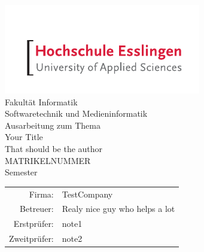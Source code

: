 \begin{titlepage}
	\begin{center}
		\includegraphics[scale=2.5]{bilder/hs-logo.pdf}\\
		\vspace{1cm} \Large Fakultät Informatik\\
		\vspace{0.5cm} \Large Softwaretechnik und Medieninformatik\\
		\vspace{1.25cm} \Large Ausarbeitung zum Thema\\
		\vspace{0.5cm} \Huge Your Title \\
		\vspace{1.5cm} \Large That should be the author \\
		\vspace{0.2cm} \small MATRIKELNUMMER\\
		\vspace{0.5cm} \normalsize Semester \the\year\\
		\vfill
		
		\begin{tabular}{rl}
			Firma: & TestCompany\\ [0.1cm]
			Betreuer: & Realy nice guy who helps a lot\\ [0.5cm]
			Erstprüfer: & note1\\ [0.1cm]
			Zweitprüfer: & note2\\[0.5cm]
		\end{tabular}
	\end{center}
\end{titlepage}